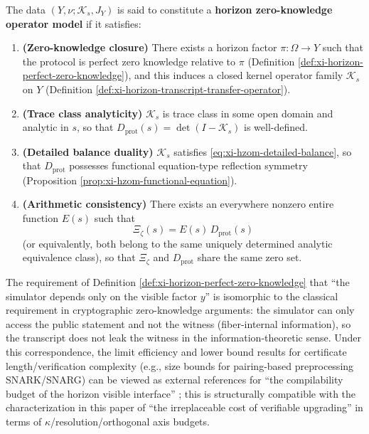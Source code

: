 \begin{definition}\label{def:xi-hzom}
The data \((Y,\nu;\mathcal{K}_s,J_Y)\) is said to constitute a \textbf{horizon zero-knowledge operator model} if it satisfies:
\begin{enumerate}
  \item \textbf{(Zero-knowledge closure)} There exists a horizon factor \(\pi:\Omega\to Y\) such that the protocol is perfect zero knowledge relative to \(\pi\) (Definition \ref{def:xi-horizon-perfect-zero-knowledge}), and this induces a closed kernel operator family \(\mathcal{K}_s\) on \(Y\) (Definition \ref{def:xi-horizon-transcript-transfer-operator}).
  \item \textbf{(Trace class analyticity)} \(\mathcal{K}_s\) is trace class in some open domain and analytic in \(s\), so that \(D_{\mathrm{prot}}(s)=\det(I-\mathcal{K}_s)\) is well-defined.
  \item \textbf{(Detailed balance duality)} \(\mathcal{K}_s\) satisfies \eqref{eq:xi-hzom-detailed-balance}, so that \(D_{\mathrm{prot}}\) possesses functional equation-type reflection symmetry (Proposition \ref{prop:xi-hzom-functional-equation}).
  \item \textbf{(Arithmetic consistency)} There exists an everywhere nonzero entire function \(E(s)\) such that
  \[
  \Xi_{\zeta}(s)=E(s)\,D_{\mathrm{prot}}(s)
  \]
  (or equivalently, both belong to the same uniquely determined analytic equivalence class), so that \(\Xi_{\zeta}\) and \(D_{\mathrm{prot}}\) share the same zero set.
\end{enumerate}
\end{definition}

\begin{remark}\label{rem:xi-hzom-crypto-alignment}
The requirement of Definition \ref{def:xi-horizon-perfect-zero-knowledge} that ``the simulator depends only on the visible factor \(y\)'' is isomorphic to the classical requirement in cryptographic zero-knowledge arguments: the simulator can only access the public statement and not the witness (fiber-internal information), so the transcript does not leak the witness in the information-theoretic sense.
Under this correspondence, the limit efficiency and lower bound results for certificate length/verification complexity (e.g., size bounds for pairing-based preprocessing SNARK/SNARG) can be viewed as external references for ``the compilability budget of the horizon visible interface'' \cite{Groth2016SizePairingNIZK};
this is structurally compatible with the characterization in this paper of ``the irreplaceable cost of verifiable upgrading'' in terms of \(\kappa\)/resolution/orthogonal axis budgets.
\end{remark}

